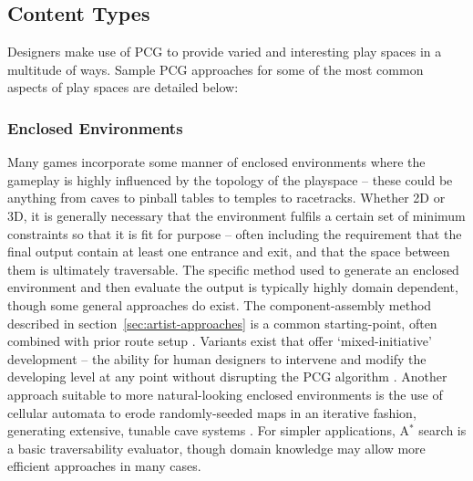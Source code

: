 \documentclass{acm_proc_article-sp}
\begin{document}
\subsection{Content Types}
Designers make use of PCG to provide varied and interesting play spaces in a multitude of ways. Sample PCG approaches for some of the most common aspects of play spaces are detailed below:

\subsubsection{Enclosed Environments}
Many games incorporate some manner of enclosed environments where the gameplay is highly influenced by the topology of the playspace -- these could be anything from caves to pinball tables to temples to racetracks. Whether 2D or 3D, it is generally necessary that the environment fulfils a certain set of minimum constraints so that it is fit for purpose -- often including the requirement that the final output contain at least one entrance and exit, and that the space between them is ultimately traversable. The specific method used to generate an enclosed environment and then evaluate the output is typically highly domain dependent, though some general approaches do exist. The component-assembly method described in section~\ref{sec:artist-approaches} is a common starting-point, often combined with prior route setup \cite{smith2011launchpad}. Variants exist that offer `mixed-initiative' development -- the ability for human designers to intervene and modify the developing level at any point without disrupting the PCG algorithm \cite{mawhorter2010procedural}. Another approach suitable to more natural-looking enclosed environments is the use of cellular automata to erode randomly-seeded maps in an iterative fashion, generating extensive, tunable cave systems \cite{johnson2010cellular}. For simpler applications, A$^*$ search is a basic traversability evaluator, though domain knowledge may allow more efficient approaches in many cases.
\end{document}
